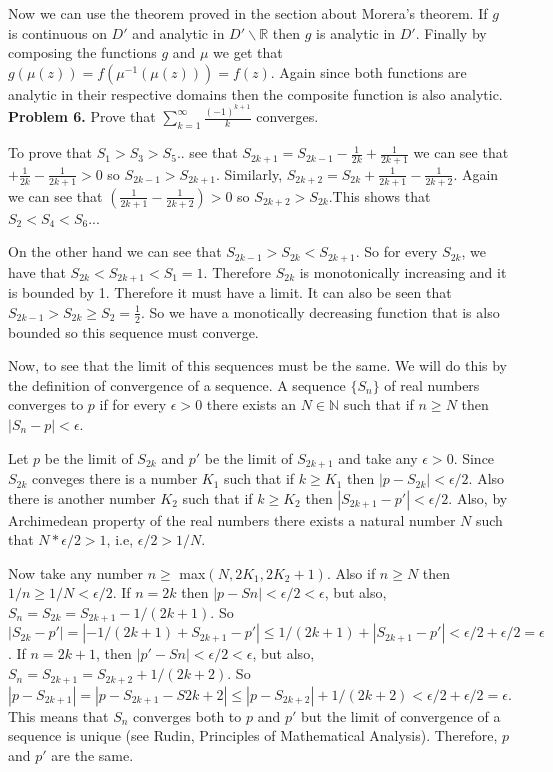 \documentclass[letterpaper,twoside,11pt]{article}
\begin{document}
\begin{enumerate}[a)]
Now we can use the theorem proved in the section about Morera's theorem. If $g$ is continuous on $D'$ and analytic in $D'\backslash\mathbb{R}$ then $g$ is analytic in $D'$. Finally by composing the functions $g$ and $\mu$ we get that $g(\mu(z))=f(\mu^{-1}(\mu(z)))=f(z)$. Again since both functions are analytic in their respective domains then the composite function is also analytic. 
\newpage
\textbf{Problem 6.}
Prove that $\sum_{k=1}^{\infty} \frac{(-1)^{k+1}}{k}$ converges.

To prove that $S_1>S_3>S_5..$ see that $S_{2k+1}=S_{2k-1}-\frac{1}{2k}+\frac{1}{2k+1}$ we can see that $+\frac{1}{2k}-\frac{1}{2k+1}>0$ so $S_{2k-1}>S_{2k+1}$. Similarly, $S_{2k+2}=S_{2k}+\frac{1}{2k+1}-\frac{1}{2k+2}$. Again we can see that $(\frac{1}{2k+1}-\frac{1}{2k+2})>0$ so $S_{2k+2}>S_{2k}$.This shows that $S_2<S_4<S_6..$.

On the other hand we can see that $S_{2k-1}>S_{2k}<S_{2k+1}$. So for every $S_{2k}$, we have that $S_{2k}<S_{2k+1}<S_{1}=1$. Therefore $S_{2k}$ is monotonically increasing and it is bounded by 1. Therefore it must have a limit. It can also be seen that $S_{2k-1}>S_{2k}\geq S_2=\frac{1}{2}$. So we have a monotically decreasing function that is also bounded so this sequence must converge.

Now, to see that the limit of this sequences must be the same. We will do this by the definition of convergence of a sequence. A sequence $\{S_n\}$ of real numbers converges to $p$ if for every $\epsilon>0$ there exists an $N \in \mathbb{N}$ such that if $n\geq N$ then $|S_n-p|<\epsilon$. 


Let $p$ be the limit of $S_{2k}$ and $p'$ be the limit of $S_{2k+1}$ and  take any $\epsilon > 0$. Since $S_{2k}$ conveges there is a number $K_1$ such that if $k\geq K_1$ then $|p-S_{2k}|<\epsilon/2$. Also there is another number $K_2$ such that if $k\geq K_2$ then $|S_{2k+1}-p'|<\epsilon/2$. Also, by Archimedean property of the real numbers there exists a natural number $N$ such that $N*\epsilon/2>1$, i.e, $\epsilon/2>1/N$.

Now take any number $n\geq$ max$(N,2K_1,2K_2+1)$. Also if $n\geq N$ then $1/n\geq 1/N<\epsilon/2.$ If $n=2k$ then $|p-Sn|<\epsilon/2<\epsilon$, but also, $S_n = S_{2k} = S_{2k+1}-1/(2k+1)$. So $|S_{2k}-p'|=|-1/(2k+1)+S_{2k+1}-p'| \leq 1/(2k+1)+|S_{2k+1}-p'|<\epsilon/2 + \epsilon/2 = \epsilon$. If $n=2k+1$, then $|p'-Sn|<\epsilon/2<\epsilon$, but also, $S_n=S_{2k+1}=S_{2k+2}+1/(2k+2)$. So $|p-S_{2k+1}|=|p-S_{2k+1}-S{2k+2}|\leq |p-S_{2k+2}|+1/(2k+2)<\epsilon/2+\epsilon/2=\epsilon$. This means that $S_n$ converges both to $p$ and $p'$ but the limit of convergence of a sequence is unique (see Rudin, Principles of Mathematical Analysis). Therefore, $p$ and $p'$ are the same. 
 


\end{enumerate}
\end{document}
